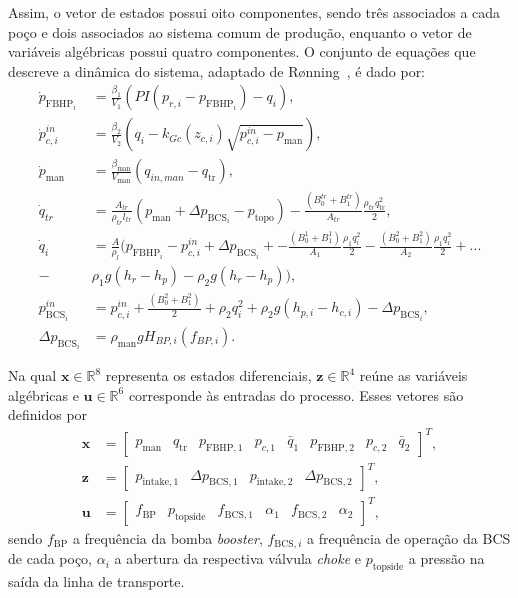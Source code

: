 \documentclass[10pt,a4paper]{article}
\newcommand{\mat}[1]{\mathbf{#1}}
\newcommand{\bcs}{\mathrm{BCS}}
\newcommand{\fbhp}{\mathrm{FBHP}}
\newcommand{\man}{\mathrm{man}}
\newcommand{\tr}{\mathrm{tr}}
\begin{document}
Assim, o vetor de estados possui oito componentes, sendo três associados
a cada poço e dois associados ao sistema comum de produção, enquanto o
vetor de variáveis algébricas possui quatro componentes. O conjunto de
equações que descreve a dinâmica do sistema, adaptado de Rønning~\cite{ronning2011}, é dado por:
\begin{align}
\dot{p}_{\text{FBHP}_i} &= \frac{\beta_1}{V_1} \left( PI(p_{r,i} - p_{\text{FBHP}_i}) - q_i \right), \\
\dot{p}^{in}_{c,i} &= \frac{\beta_2}{V_2} \left( q_i - k_{Gc}(z_{c,i}) \sqrt{p^{in}_{c,i} - p_{\text{man}}} \right), \\
\dot{p}_{\text{man}} &= \frac{\beta_{\text{man}}}{V_{\text{man}}} (q_{in,man} - q_{\text{tr}}), \\
\dot{q}_{tr} &= \frac{A_{tr}}{\rho_{tr} l_{tr}} (p_{\text{man}} + \Delta p_{\text{BCS}_i} - p_{\text{topo}}) 
- \frac{(B_0^{tr} + B_1^{tr})}{A_{tr}} \frac{\rho_{tr} q_{\text{tr}}^2}{2}, \\
\dot{q}_i &= \frac{A}{\rho_l} \Bigg( p_{\text{FBHP}_i} - p^{in}_{c,i} + \Delta p_{\text{BCS}_i} +
- \frac{(B_0^1 + B_1^1)}{A_1} \frac{\rho_1 q_i^2}{2}
- \frac{(B_0^2 + B_1^2)}{A_2} \frac{\rho_1 q_i^2}{2} + ... \nonumber \\
-& \rho_1 g (h_r - h_p) - \rho_2 g (h_r - h_p) \Bigg),\\
p^{in}_{\text{BCS}_i} &= p^{in}_{c,i} + \frac{(B_0^2 + B_1^2)}{2} + 
 \rho_2 q_i^2 + \rho_2 g (h_{p,i} - h_{c,i}) - \Delta p_{\text{BCS}_i}, \\
\Delta p_{\text{BCS}_i} &= \rho_{\text{man}} g H_{BP,i}(f_{BP,i}).
\end{align}

Na qual $\mat{x}\in\mathbb{R}^{8}$ representa os estados diferenciais, $\mat{z}\in\mathbb{R}^{4}$ reúne as variáveis algébricas e $\mat{u}\in\mathbb{R}^{6}$ corresponde às entradas do processo. Esses vetores são definidos por
\begin{align}
\mat{x}&=\begin{bmatrix}p_{\man}&q_{\tr}&p_{\fbhp,1}&p_{c,1}&\bar q_1&p_{\fbhp,2}&p_{c,2}&\bar q_2\end{bmatrix}^{T},\nonumber\\
\mat{z}&=\begin{bmatrix}p_{\mathrm{intake},1}&\Delta p_{\bcs,1}&p_{\mathrm{intake},2}&\Delta p_{\bcs,2}\end{bmatrix}^{T},\nonumber\\
\mat{u}&=\begin{bmatrix}f_{\mathrm{BP}}&p_{\mathrm{topside}}&f_{\bcs,1}&\alpha_1&f_{\bcs,2}&\alpha_2\end{bmatrix}^{T},\label{eq:vetores}
\end{align}
sendo $f_{\mathrm{BP}}$ a frequência da bomba \textit{booster}, $f_{\bcs,i}$ a frequência de operação da BCS de cada poço, $\alpha_i$ a abertura da respectiva válvula \textit{choke} e $p_{\mathrm{topside}}$ a pressão na saída da linha de transporte.
\end{document}

